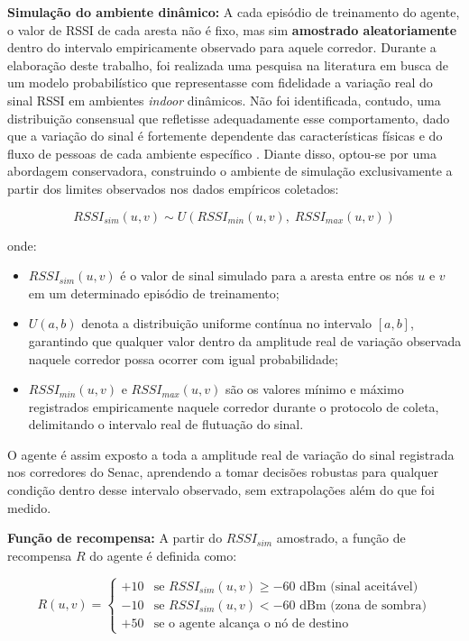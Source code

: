 \documentclass[
    12pt,                %
    openright,           %
    oneside,             %
    a4paper,             %
    english,             %
    brazil               %
]{abntex2}
\begin{document}
\textbf{Simulação do ambiente dinâmico:} A cada episódio de treinamento do agente,
o valor de RSSI de cada aresta não é fixo, mas sim \textbf{amostrado aleatoriamente}
dentro do intervalo empiricamente observado para aquele corredor. Durante a elaboração
deste trabalho, foi realizada uma pesquisa na literatura em busca de um modelo
probabilístico que representasse com fidelidade a variação real do sinal RSSI em
ambientes \textit{indoor} dinâmicos. Não foi identificada, contudo, uma distribuição
consensual que refletisse adequadamente esse comportamento, dado que a variação do
sinal é fortemente dependente das características físicas e do fluxo de pessoas de
cada ambiente específico \cite{Chia2025}. Diante disso, optou-se por uma abordagem
conservadora, construindo o ambiente de simulação exclusivamente a partir dos limites
observados nos dados empíricos coletados:

$$ RSSI_{sim}(u,v) \sim U\left(RSSI_{min}(u,v),\; RSSI_{max}(u,v)\right) $$

onde:
\begin{itemize}
    \item $RSSI_{sim}(u,v)$ é o valor de sinal simulado para a aresta entre os nós
    $u$ e $v$ em um determinado episódio de treinamento;
    \item $U(a, b)$ denota a distribuição uniforme contínua no intervalo $[a, b]$,
    garantindo que qualquer valor dentro da amplitude real de variação observada
    naquele corredor possa ocorrer com igual probabilidade;
    \item $RSSI_{min}(u,v)$ e $RSSI_{max}(u,v)$ são os valores mínimo e máximo
    registrados empiricamente naquele corredor durante o protocolo de coleta,
    delimitando o intervalo real de flutuação do sinal.
\end{itemize}

O agente é assim exposto a toda a amplitude real de variação do sinal registrada
nos corredores do Senac, aprendendo a tomar decisões robustas para qualquer
condição dentro desse intervalo observado, sem extrapolações além do que foi medido.

\textbf{Função de recompensa:} A partir do $RSSI_{sim}$ amostrado, a função de
recompensa $R$ do agente é definida como:

$$
R(u,v) =
\begin{cases}
    +10 & \text{se } RSSI_{sim}(u,v) \geq -60 \text{ dBm (sinal aceitável)} \\
    -10 & \text{se } RSSI_{sim}(u,v) < -60 \text{ dBm (zona de sombra)} \\
    +50 & \text{se o agente alcança o nó de destino}
\end{cases}
$$
\end{document}
